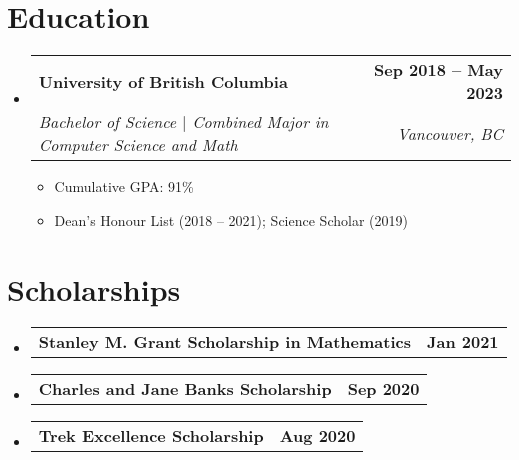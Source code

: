 \documentclass[letterpaper,11pt]{article}
\makeatletter
\newcommand{\resumeItem}[1]{
  \item\small{
    {#1 \vspace{-2pt}}
  }
}
\newcommand{\resumeSubheading}[4]{
  \vspace{-2pt}\item
    \begin{tabular*}{1.0\textwidth}[t]{l@{\extracolsep{\fill}}r}
      \textbf{#1} & \textbf{\small #2} \\
      \textit{\small#3} & \textit{\small #4} \\
    \end{tabular*}\vspace{-7pt}
}
\newcommand{\resumeScholarshipHeading}[2]{
    \item
    \begin{tabular*}{1\textwidth}{l@{\extracolsep{\fill}}r}
      \small#1 & \textbf{\small #2}\\
    \end{tabular*}
}
\newcommand{\resumeSubHeadingListStart}{\begin{itemize}[leftmargin=0.0in, label={}]}
\newcommand{\resumeSubHeadingListEnd}{\end{itemize}}
\newcommand{\resumeItemListStart}{\begin{itemize}}
\newcommand{\resumeItemListEnd}{\end{itemize}\vspace{-5pt}}
\makeatother
\begin{document}
\section{Education}
  \resumeSubHeadingListStart
    \resumeSubheading
      {University of British Columbia}{Sep 2018 -- May 2023}
      {Bachelor of Science $|$ Combined Major in Computer Science and Math}{Vancouver, BC}
      \resumeItemListStart
        \resumeItem{Cumulative GPA: 91\%}
        \resumeItem{Dean's Honour List (2018 -- 2021); Science Scholar (2019)}
      \resumeItemListEnd
  \resumeSubHeadingListEnd

\section{Scholarships}
  \resumeSubHeadingListStart
    \resumeScholarshipHeading
      {\textbf{Stanley M. Grant Scholarship in Mathematics}}{Jan 2021}
    \resumeScholarshipHeading
      {\textbf{Charles and Jane Banks Scholarship}}{Sep 2020}
    \resumeScholarshipHeading
      {\textbf{Trek Excellence Scholarship}}{Aug 2020}
  \resumeSubHeadingListEnd
\end{document}

